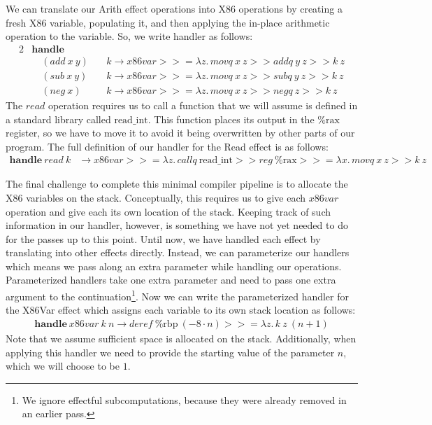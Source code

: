 \documentclass[a4paper,UKenglish,cleveref, autoref, thm-restate]{oasics-v2021}
\newcommand\bind[1]{>\!\!>\!\!= \lambda #1.\,}
\newcommand\then{>\!\!>}
\begin{document}
We can translate our Arith effect operations into X86 operations by creating a fresh X86 variable, populating it, and then applying the in-place arithmetic operation to the variable.
So, we write handler as follows:
\begin{alignat*}{2}
  & \mathbf{handle} && \\
  & \quad(\mathit{add}~x~y) &&~k \to \mathit{x86var} \bind{z} \mathit{movq}~x~z \then \mathit{addq}~y~z \then k~z \\
  & \quad(\mathit{sub}~x~y) &&~k \to \mathit{x86var} \bind{z} \mathit{movq}~x~z \then \mathit{subq}~y~z \then k~z \\
  & \quad(\mathit{neg}~x) &&~k \to \mathit{x86var} \bind{z} \mathit{movq}~x~z \then \mathit{negq}~z \then k~z
\end{alignat*}
The $\mathit{read}$ operation requires us to call a function that we will assume is defined in a standard library called $\mathrm{read\_int}$. This function places its output in the $\mathrm{\%rax}$ register, so we have to move it to avoid it being overwritten by other parts of our program.
The full definition of our handler for the Read effect is as follows:
\begin{align*}
  \mathbf{handle}~\mathit{read}~k & \to \mathit{x86var} \bind{z} \mathit{callq}~\mathrm{read\_int} \then \mathit{reg}~\mathrm{\%rax} \bind{x} \mathit{movq}~x~z \then k~z
\end{align*}

The final challenge to complete this minimal compiler pipeline is to allocate the X86 variables on the stack.
Conceptually, this requires us to give each $\mathit{x86var}$ operation and give each its own location of the stack.
Keeping track of such information in our handler, however, is something we have not yet needed to do for the passes up to this point.
Until now, we have handled each effect by translating into other effects directly.
Instead, we can parameterize our handlers which means we pass along an extra parameter while handling our operations.
Parameterized handlers take one extra parameter and need to pass one extra argument to the continuation\footnote{We ignore effectful subcomputations, because they were already removed in an earlier pass.}. 
Now we can write the parameterized handler for the X86Var effect which assigns each variable to its own stack location as follows:
\begin{align*}
  \mathbf{handle}~\mathit{x86var}~k~n \to \mathit{deref}~\mathrm{\%rbp}~(-8 \cdot n) \bind{z} k~z~(n + 1)
\end{align*}
Note that we assume sufficient space is allocated on the stack.
Additionally, when applying this handler we need to provide the starting value of the parameter $n$, which we will choose to be $1$.
\end{document}
